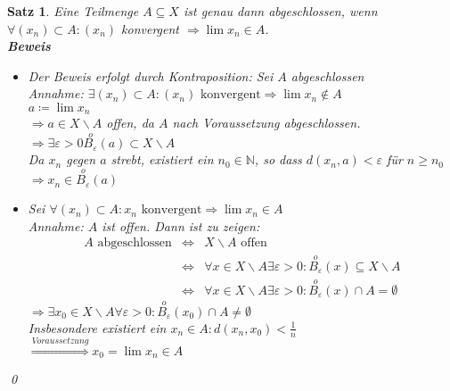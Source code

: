 \documentclass[ngerman,titlepage,twoside, parskip=half*]{scrreprt}
\newcommand*{\N}{\mathbb{N}}
\theoremstyle{plain}
\newtheorem{theorem}{Satz}[section]
\theoremstyle{definition}
\theoremstyle{remark}
\begin{document}
\begin{theorem}
\label{satz:abgTeilmenge}
Eine Teilmenge $A\subseteq X$ ist genau dann abgeschlossen, wenn $\forall (x_n) \subset A\colon(x_n)$
konvergent $\Rightarrow \lim x_n \in A$.\\
\textbf{Beweis}
\begin{itemize}
  \item["`$\Rightarrow$"'] Der Beweis erfolgt durch Kontraposition: Sei $A$ abgeschlossen\\
    Annahme: $\exists (x_n)\subset A\colon(x_n) \text{ konvergent} \Rightarrow \lim x_n \notin A$\\
    $a\coloneqq\lim x_n$\\
    $\Rightarrow a \in X\backslash A$ offen, da $A$ nach Voraussetzung abgeschlossen.\\
    $\Rightarrow \exists \varepsilon >0 \stackrel{o}{B_{\varepsilon}}(a)\subset X\backslash A$\\
    Da $x_n$ gegen $a$ strebt, existiert ein $n_0\in \N$, so dass $d(x_n,a)<\varepsilon$ für $n\geq n_0$\\
    $\Rightarrow x_n \in \stackrel{o}{B_{\varepsilon}}(a)$\textnormal{\lightning}
  \item["`$\Leftarrow$"'] Sei $\forall (x_n)\subset A\colon x_n \text{ konvergent} \Rightarrow \lim x_n \in A$\\
    Annahme: $A$ ist offen. Dann ist zu zeigen:
    \begin{align*}
      A \text{ abgeschlossen} & \Leftrightarrow & X\backslash A \text{ offen}\\
      & \Leftrightarrow & \forall x \in X\backslash A \exists \varepsilon >0\colon\stackrel{o}{B_{\varepsilon}}
      (x)\subseteq X\backslash A\\
      & \Leftrightarrow & \forall x \in X\backslash A \exists \varepsilon >0\colon\stackrel{o}{B_{\varepsilon}}
      (x)\cap A = \emptyset
    \end{align*}
    $\Rightarrow \exists x_0 \in X\backslash A \forall \varepsilon >0\colon\stackrel{o}{B_{\varepsilon}}(x_0)
    \cap A \neq \emptyset$\\
    Insbesondere existiert ein $x_n \in A \colon d(x_n,x_0)<\frac{1}{n}$\\
    $\stackrel{Voraussetzung}{\Longrightarrow}x_0=\lim x_n \in A$\textnormal{\lightning}
\end{itemize}
\qed
\end{theorem}
\end{document}
